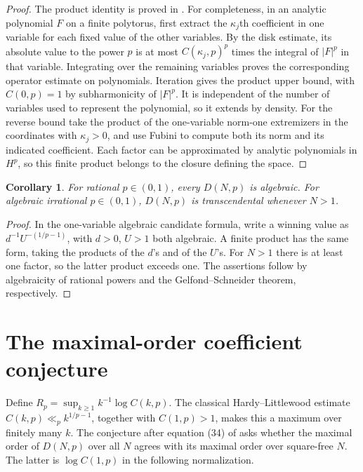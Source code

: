 \documentclass[11pt]{article}
\newtheorem{corollary}[theorem]{Corollary}
\begin{document}
\begin{proof}
The product identity is proved in \cite[Section~4]{BBSS}.
For completeness, in an analytic polynomial \(F\) on a finite
polytorus, first extract the \(\kappa_j\)th coefficient in one
variable for each fixed value of the other variables.
By the disk estimate, its absolute value to the power \(p\)
is at most \(C(\kappa_j,p)^p\) times the integral of
\(|F|^p\) in that variable. Integrating over the remaining
variables proves the corresponding operator estimate on
polynomials. Iteration gives the product upper bound, with
\(C(0,p)=1\) by subharmonicity of \(|F|^p\). It is independent
of the number of variables used to represent the polynomial,
so it extends by density. For the reverse bound take the
product of the one-variable norm-one extremizers in the
coordinates with \(\kappa_j>0\), and use Fubini to compute both
its norm and its indicated coefficient. Each factor can be approximated by analytic polynomials
in \(H^p\), so this
finite product belongs to the closure defining the space.
\end{proof}

\begin{corollary}
For rational \(p\in(0,1)\), every \(D(N,p)\) is algebraic.
For algebraic irrational \(p\in(0,1)\), \(D(N,p)\) is
transcendental whenever \(N>1\).
\end{corollary}

\begin{proof}
In the one-variable algebraic candidate formula, write a
winning value as \(d^{-1}U^{-(1/p-1)}\), with \(d>0\), \(U>1\)
both algebraic. A finite product has the same form, taking
the products of the \(d\)'s and of the \(U\)'s. For \(N>1\)
there is at least one factor, so the latter product exceeds
one. The assertions follow by algebraicity of rational powers
and the Gelfond--Schneider theorem, respectively.
\end{proof}

\section{The maximal-order coefficient conjecture}
\label{sec:maximal-dirichlet}

Define \(R_p=\sup_{k\geq1}k^{-1}\log C(k,p)\).
The classical Hardy--Littlewood estimate
\(C(k,p)\ll_p k^{1/p-1}\), together with \(C(1,p)>1\), makes
this a maximum over finitely many \(k\). The conjecture after
equation (34) of \cite[Section~4]{BBSS} asks whether the maximal
order of \(D(N,p)\) over all \(N\) agrees with its maximal order
over square-free \(N\). The latter is \(\log C(1,p)\) in
the following normalization.
\end{document}
